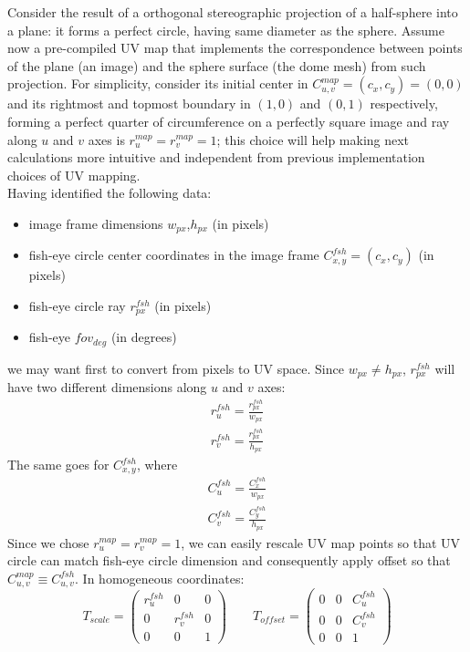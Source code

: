 Consider the result of a orthogonal stereographic projection of a half-sphere into a plane: it forms a perfect circle, having same diameter as the sphere. Assume now a pre-compiled UV map that implements the correspondence between points of the plane (an image) and the sphere surface (the dome mesh) from such projection. For simplicity, consider its initial center in $C^{map}_{u,v}=(c_x,c_y)=(0,0)$ and its rightmost and topmost boundary in $(1,0)$ and $(0,1)$ respectively, forming a perfect quarter of circumference on a perfectly square image and ray along $u$ and $v$ axes is $r^{map}_{u}=r^{map}_{v}=1$; this choice will help making next calculations more intuitive and independent from previous implementation choices of UV mapping.\\
Having identified the following data:
\begin{itemize}
\item image frame dimensions $w_{px}$,$h_{px}$ (in pixels)
\item fish-eye circle center coordinates in the image frame $C^{fsh}_{x,y}=(c_x,c_y)$ (in pixels)
\item fish-eye circle ray $r^{fsh}_{px}$ (in pixels)
\item fish-eye $fov_{deg}$ (in degrees)
\end{itemize}
we may want first to convert from pixels to UV space. Since $w_{px} \ne h_{px}$, $r^{fsh}_{px}$ will have two different dimensions along $u$ and $v$ axes:
\begin{equation}
\begin{array}{c}
r^{fsh}_{u}=\frac{r^{fsh}_{px}}{w_{px}}\\[0.6em]
r^{fsh}_{v}=\frac{r^{fsh}_{px}}{h_{px}}
\end{array}
\end{equation}
The same goes for $C^{fsh}_{x,y}$, where
\begin{equation}
\begin{array}{c}
C^{fsh}_{u}=\frac{C^{fsh}_{x}}{w_{px}}\\[0.6em]
C^{fsh}_{v}=\frac{C^{fsh}_{y}}{h_{px}}
\end{array}
\end{equation}
Since we chose $r^{map}_{u}=r^{map}_{v}=1$, we can easily rescale UV map points so that UV circle can match fish-eye circle dimension and consequently apply offset so that $C^{map}_{u,v} \equiv C^{fsh}_{u,v}$. In homogeneous coordinates:
\begin{equation}
T_{scale} = \left( \begin{array}{ccc}
r^{fsh}_{u} & 0 & 0 \\[0.5em]
0 & r^{fsh}_{v} & 0 \\[0.5em]
0 & 0 & 1
\end{array} \right)
\qquad
T_{offset} = \left( \begin{array}{ccc}
0 & 0 & C^{fsh}_{u} \\[0.5em]
0 & 0 & C^{fsh}_{v} \\[0.5em]
0 & 0 & 1
\end{array} \right)
\label{UV_scale_offset_180}
\end{equation}
